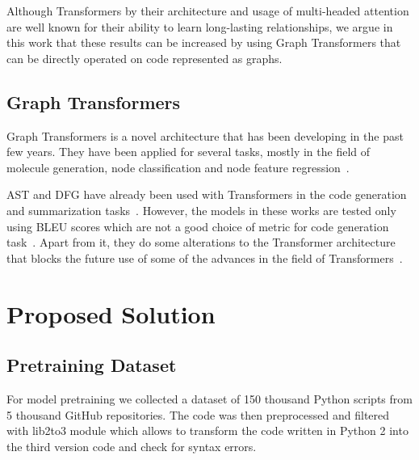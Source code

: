 \documentclass[sigplan,screen,anonymous,natbib=false]{acmart}
\begin{document}
Although Transformers by their architecture and usage of multi-headed attention are well known for their ability to learn long-lasting relationships,
we argue in this work that these results can be increased by using Graph Transformers that can be directly operated on code represented as graphs.

\subsection{Graph Transformers}\label{subsec:graph-transformers}

Graph Transformers is a novel architecture that has been developing in the past few years. 
They have been applied for several tasks, mostly in the field of molecule generation, node classification and node feature regression~\cite{kim_pure_2022,kreuzer_rethinking_2021,dwivedi_generalization_2021,ying_transformers_2021}.

AST and DFG have already been used with Transformers in the code generation and summarization tasks~\cite{wang_unified_2022,tang_ast-transformer_2021,sun_treegen_2020}.
However, the models in these works are tested only using BLEU scores which are not a good choice of metric for code generation task~\cite{hendrycks_measuring_2021,chen_evaluating_2021}.
Apart from it, they do some alterations to the Transformer architecture that blocks the future use of some of the advances in the field of Transformers~\cite{kim_pure_2022}.

\section{Proposed Solution}\label{sec:proposed-solution}

\subsection{Pretraining Dataset}\label{subsec:pretraining-dataset}

For model pretraining we collected a dataset of 150 thousand Python scripts from 5 thousand GitHub repositories.
The code was then preprocessed and filtered with lib2to3 module which allows to transform the code written in Python 2 into the third version code and check for syntax errors.
\end{document}
